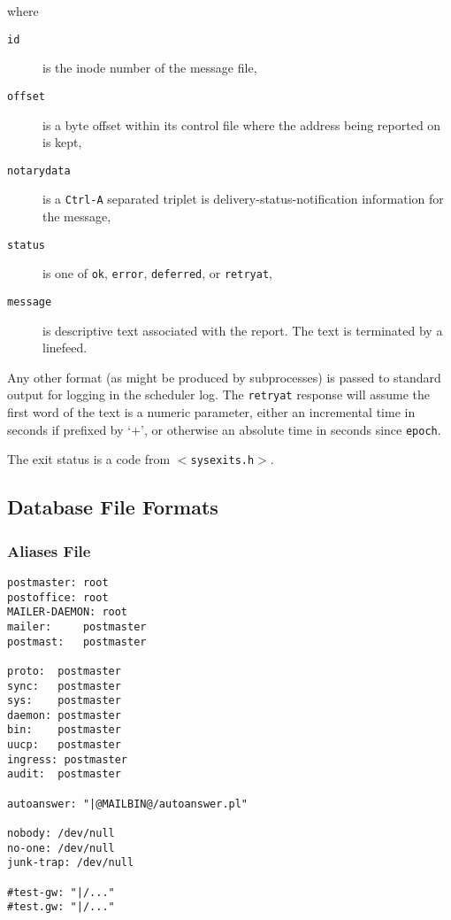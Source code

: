 where
\begin{description}
\item[{\tt id}] \mbox{}

is the inode number of the message file,

\item[{\tt offset}] \mbox{}

is a byte offset within its control file where the address
being  reported on  is kept,

\item[{\tt notarydata}] \mbox{}

is a {\tt Ctrl-A} separated triplet is delivery-status-notification
information for  the message, 

\item[{\tt status}] \mbox{}

is one of {\tt ok}, {\tt error}, {\tt deferred}, or {\tt retryat},

\item[{\tt message}] \mbox{}

is  descriptive  text  associated
with  the  report.   The text is terminated by a linefeed.

\end{description}


Any other format (as might be produced by subprocesses) is
passed  to  standard  output  for logging in the scheduler
log. The {\tt retryat} response will assume the first word  of
the text is a numeric parameter, either an incremental
time in seconds if prefixed by `+', or otherwise an absolute
time in seconds since {\tt epoch}.

The exit status is a code from {\tt {\(<\)}sysexits.h{\(>\)}}.






\subsection{Database File Formats}




\subsubsection{Aliases File}



\begin{tscreen}
\begin{verbatim}
postmaster: root
postoffice: root
MAILER-DAEMON: root
mailer:     postmaster
postmast:   postmaster

proto:  postmaster
sync:   postmaster
sys:    postmaster
daemon: postmaster
bin:    postmaster
uucp:   postmaster
ingress: postmaster
audit:  postmaster

autoanswer: "|@MAILBIN@/autoanswer.pl"

nobody: /dev/null
no-one: /dev/null
junk-trap: /dev/null

#test-gw: "|/..."
#test.gw: "|/..."
\end{verbatim}
\end{tscreen}



